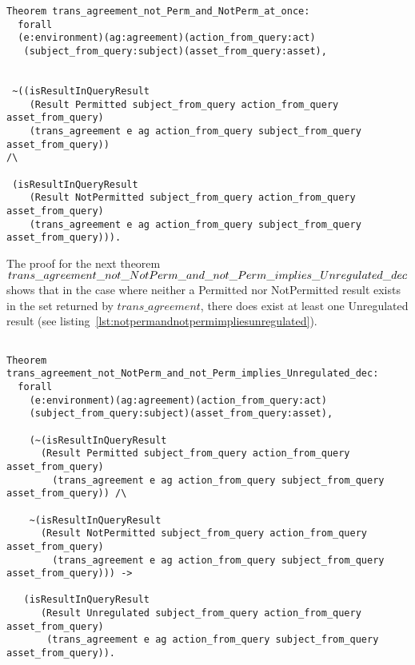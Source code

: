 \begin{lstlisting}
Theorem trans_agreement_not_Perm_and_NotPerm_at_once:
  forall
  (e:environment)(ag:agreement)(action_from_query:act)
   (subject_from_query:subject)(asset_from_query:asset),


 ~((isResultInQueryResult 
    (Result Permitted subject_from_query action_from_query asset_from_query)
    (trans_agreement e ag action_from_query subject_from_query asset_from_query)) 
/\

 (isResultInQueryResult 
    (Result NotPermitted subject_from_query action_from_query asset_from_query)
    (trans_agreement e ag action_from_query subject_from_query asset_from_query))).

\end{lstlisting}

The proof for the next theorem $trans\_agreement\_not\_NotPerm\_and\_not\_Perm \newline \_implies\_Unregulated\_dec$ shows that in the case where neither a Permitted nor NotPermitted result exists in the set returned by $trans\_agreement$, there does exist at least one Unregulated result (see listing~\ref{lst:notpermandnotpermimpliesunregulated}).

\begin{lstlisting}

Theorem trans_agreement_not_NotPerm_and_not_Perm_implies_Unregulated_dec:
  forall
    (e:environment)(ag:agreement)(action_from_query:act)
    (subject_from_query:subject)(asset_from_query:asset),

    (~(isResultInQueryResult 
      (Result Permitted subject_from_query action_from_query asset_from_query)
        (trans_agreement e ag action_from_query subject_from_query asset_from_query)) /\

    ~(isResultInQueryResult 
      (Result NotPermitted subject_from_query action_from_query asset_from_query)
        (trans_agreement e ag action_from_query subject_from_query asset_from_query))) ->

   (isResultInQueryResult 
      (Result Unregulated subject_from_query action_from_query asset_from_query)
       (trans_agreement e ag action_from_query subject_from_query asset_from_query)).
\end{lstlisting}


